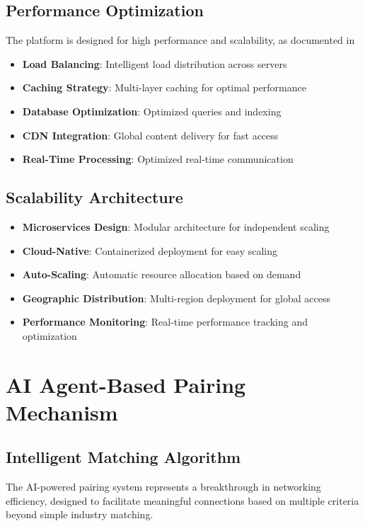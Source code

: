 \subsection{Performance Optimization}

The platform is designed for high performance and scalability, as documented in \:

\begin{itemize}
    \item \textbf{Load Balancing}: Intelligent load distribution across servers
    \item \textbf{Caching Strategy}: Multi-layer caching for optimal performance
    \item \textbf{Database Optimization}: Optimized queries and indexing
    \item \textbf{CDN Integration}: Global content delivery for fast access
    \item \textbf{Real-Time Processing}: Optimized real-time communication
\end{itemize}

\subsection{Scalability Architecture}

\begin{itemize}
    \item \textbf{Microservices Design}: Modular architecture for independent scaling
    \item \textbf{Cloud-Native}: Containerized deployment for easy scaling
    \item \textbf{Auto-Scaling}: Automatic resource allocation based on demand
    \item \textbf{Geographic Distribution}: Multi-region deployment for global access
    \item \textbf{Performance Monitoring}: Real-time performance tracking and optimization
\end{itemize}

\section{AI Agent-Based Pairing Mechanism}

\subsection{Intelligent Matching Algorithm}
The AI-powered pairing system represents a breakthrough in networking efficiency, designed to facilitate meaningful connections based on multiple criteria beyond simple industry matching.

